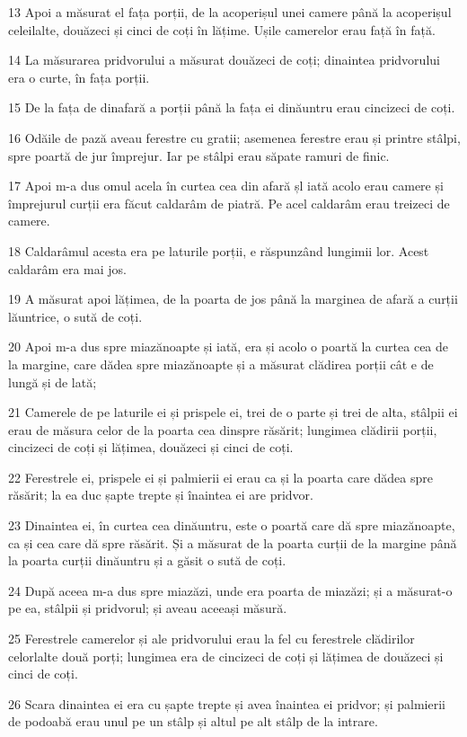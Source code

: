\par 13 Apoi a măsurat el fața porții, de la acoperișul unei camere până la acoperișul celeilalte, douăzeci și cinci de coți în lățime. Ușile camerelor erau față în față.
\par 14 La măsurarea pridvorului a măsurat douăzeci de coți; dinaintea pridvorului era o curte, în fața porții.
\par 15 De la fața de dinafară a porții până la fața ei dinăuntru erau cincizeci de coți.
\par 16 Odăile de pază aveau ferestre cu gratii; asemenea ferestre erau și printre stâlpi, spre poartă de jur împrejur. Iar pe stâlpi erau săpate ramuri de finic.
\par 17 Apoi m-a dus omul acela în curtea cea din afară șl iată acolo erau camere și împrejurul curții era făcut caldarâm de piatră. Pe acel caldarâm erau treizeci de camere.
\par 18 Caldarâmul acesta era pe laturile porții, e răspunzând lungimii lor. Acest caldarâm era mai jos.
\par 19 A măsurat apoi lățimea, de la poarta de jos până la marginea de afară a curții lăuntrice, o sută de coți.
\par 20 Apoi m-a dus spre miazănoapte și iată, era și acolo o poartă la curtea cea de la margine, care dădea spre miazănoapte și a măsurat clădirea porții cât e de lungă și de lată;
\par 21 Camerele de pe laturile ei și prispele ei, trei de o parte și trei de alta, stâlpii ei erau de măsura celor de la poarta cea dinspre răsărit; lungimea clădirii porții, cincizeci de coți și lățimea, douăzeci și cinci de coți.
\par 22 Ferestrele ei, prispele ei și palmierii ei erau ca și la poarta care dădea spre răsărit; la ea duc șapte trepte și înaintea ei are pridvor.
\par 23 Dinaintea ei, în curtea cea dinăuntru, este o poartă care dă spre miazănoapte, ca și cea care dă spre răsărit. Și a măsurat de la poarta curții de la margine până la poarta curții dinăuntru și a găsit o sută de coți.
\par 24 După aceea m-a dus spre miazăzi, unde era poarta de miazăzi; și a măsurat-o pe ea, stâlpii și pridvorul; și aveau aceeași măsură.
\par 25 Ferestrele camerelor și ale pridvorului erau la fel cu ferestrele clădirilor celorlalte două porți; lungimea era de cincizeci de coți și lățimea de douăzeci și cinci de coți.
\par 26 Scara dinaintea ei era cu șapte trepte și avea înaintea ei pridvor; și palmierii de podoabă erau unul pe un stâlp și altul pe alt stâlp de la intrare.
